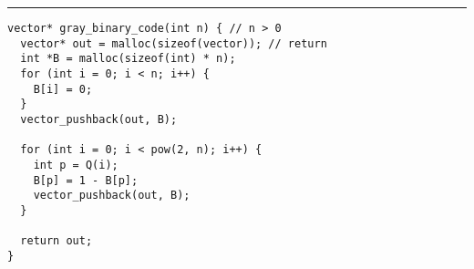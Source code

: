 \documentclass{article}
\begin{document}
\lstset{language = C,
    extendedchars = \true,
    keepspaces = true, 
    breaklines=true,
    frame=lines}
\hrule
\begin{lstlisting}[title=\textbf {Алгоритм 1.2} Построение бинарного кода Грея]
vector* gray_binary_code(int n) { // n > 0
  vector* out = malloc(sizeof(vector)); // return
  int *B = malloc(sizeof(int) * n);
  for (int i = 0; i < n; i++) {
    B[i] = 0;
  }
  vector_pushback(out, B);

  for (int i = 0; i < pow(2, n); i++) {
    int p = Q(i);
    B[p] = 1 - B[p];
    vector_pushback(out, B);
  }

  return out;
}
\end{lstlisting}
\end{document}
